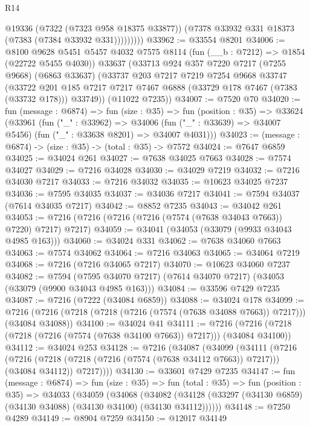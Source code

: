 \begin{lexlean}{R14}
\begin{coremodule}
                @19336
                (@7322 (@7323 @958 @18375 @33877))
                (@7378 @33932 @331 @18373 (@7383 (@7384 @33932 @331)))))))))
@33962 := @33554 @8201
@34006 := @8100
    @9628
    @5451
    @5457
    @4032
    @7575
    @8114
    (fun (__b : @7212) => @1854 (@22722 @5455 @4030))
    @33637
    (@33713
      @924
      @357
      @7220
      @7217
      (@7255 @9668)
      (@6863 @33637)
      (@33737
        @203
        @7217
        @7219
        @7254
        @9668
        @33747
        (@33722 @201 @185 @7217 @7217 @7467 @6888 (@33729 @178 @7467 (@7383 (@33732 @178))) @33749))
      (@11022 @7235))
@34007 := @7520 @70
@34020 := fun (message : @6874) =>
  fun (size : @35) =>
  fun (position : @35) =>
  @33624
    (@33961
      (fun ("_" : @33962) =>
      @34006 (fun ("_" : @33639) => @34007 @5456) (fun ("_" : @33638 @8201) => @34007 @4031)))
@34023 := (message : @6874) -> (size : @35) -> (total : @35) -> @7572
@34024 := @7647 @6859
@34025 := @34024 @261
@34027 := @7638 @34025 @7663
@34028 := @7574 @34027
@34029 := @7216 @34028
@34030 := @34029 @7219
@34032 := @7216 @34030 @7217
@34033 := @7216 @34032
@34035 := @10623 @34025 @7237
@34036 := @7595 @34035
@34037 := @34036 @7217
@34041 := @7594 @34037 (@7614 @34035 @7217)
@34042 := @8852 @7235
@34043 := @34042 @261
@34053 := @7216 (@7216 (@7216 (@7216 (@7574 (@7638 @34043 @7663)) @7220) @7217) @7217)
@34059 := @34041 (@34053 (@33079 (@9933 @34043 @4985 @163)))
@34060 := @34024 @331
@34062 := @7638 @34060 @7663
@34063 := @7574 @34062
@34064 := @7216 @34063
@34065 := @34064 @7219
@34068 := @7216 (@7216 @34065 @7217)
@34070 := @10623 @34060 @7237
@34082 := @7594
    (@7595 @34070 @7217)
    (@7614 @34070 @7217)
    (@34053 (@33079 (@9900 @34043 @4985 @163)))
@34084 := @33596 @7429 @7235
@34087 := @7216 (@7222 (@34084 @6859))
@34088 := @34024 @178
@34099 := @7216 (@7216 (@7218 (@7218 (@7216 (@7574 (@7638 @34088 @7663)) @7217))) (@34084 @34088))
@34100 := @34024 @41
@34111 := @7216 (@7216 (@7218 (@7218 (@7216 (@7574 (@7638 @34100 @7663)) @7217))) (@34084 @34100))
@34112 := @34024 @253
@34128 := @7216
    (@34087
      (@34099
        (@34111
          (@7216
            (@7216 (@7218 (@7218 (@7216 (@7574 (@7638 @34112 @7663)) @7217))) (@34084 @34112))
            @7217))))
@34130 := @33601 @7429 @7235
@34147 := fun (message : @6874) =>
  fun (size : @35) =>
  fun (total : @35) =>
  fun (position : @35) =>
  @34033
    (@34059
      (@34068
        (@34082 (@34128 (@33297 (@34130 @6859) (@34130 @34088) (@34130 @34100) (@34130 @34112))))))
@34148 := @7250 @4289
@34149 := @8904 @7259
@34150 := @12017 @34149

\end{coremodule}
\end{lexlean}
